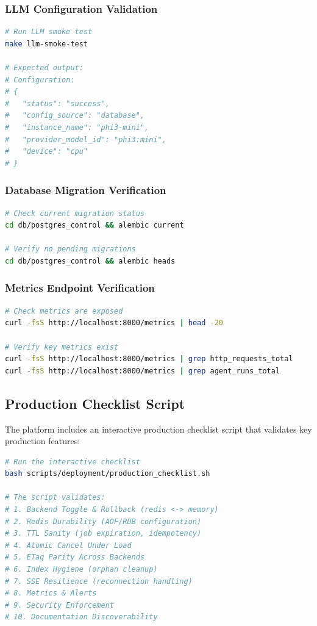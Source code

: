 \subsubsection{LLM Configuration Validation}

\begin{lstlisting}[language=bash, caption=Verify LLM configuration]
# Run LLM smoke test
make llm-smoke-test

# Expected output:
# Configuration:
# {
#   "status": "success",
#   "config_source": "database",
#   "instance_name": "phi3-mini",
#   "provider_model_id": "phi3:mini",
#   "device": "cpu"
# }
\end{lstlisting}

\subsubsection{Database Migration Verification}

\begin{lstlisting}[language=bash, caption=Verify database migrations]
# Check current migration status
cd db/postgres_control && alembic current

# Verify no pending migrations
cd db/postgres_control && alembic heads
\end{lstlisting}

\subsubsection{Metrics Endpoint Verification}

\begin{lstlisting}[language=bash, caption=Verify Prometheus metrics]
# Check metrics are exposed
curl -fsS http://localhost:8000/metrics | head -20

# Verify key metrics exist
curl -fsS http://localhost:8000/metrics | grep http_requests_total
curl -fsS http://localhost:8000/metrics | grep agent_runs_total
\end{lstlisting}

\subsection{Production Checklist Script}

The platform includes an interactive production checklist script that validates key production features:

\begin{lstlisting}[language=bash, caption=Running the production checklist script]
# Run the interactive checklist
bash scripts/deployment/production_checklist.sh

# The script validates:
# 1. Backend Toggle & Rollback (redis <-> memory)
# 2. Redis Durability (AOF/RDB configuration)
# 3. TTL Sanity (job expiration, idempotency)
# 4. Atomic Cancel Under Load
# 5. ETag Parity Across Backends
# 6. Index Hygiene (orphan cleanup)
# 7. SSE Resilience (reconnection handling)
# 8. Metrics & Alerts
# 9. Security Enforcement
# 10. Documentation Discoverability
\end{lstlisting}

